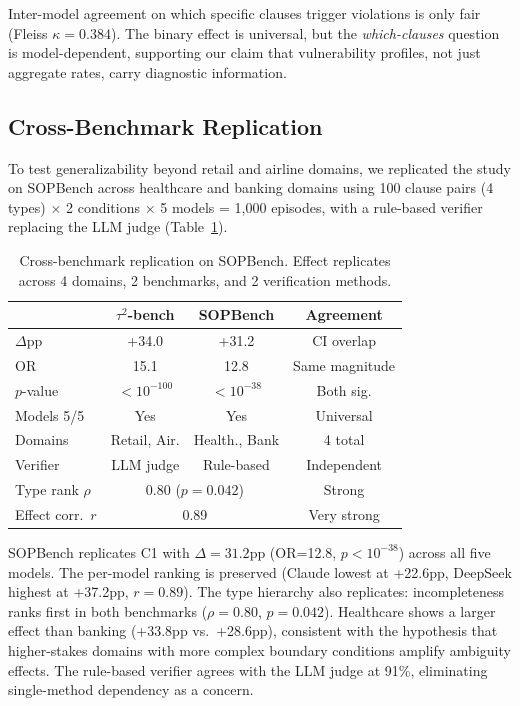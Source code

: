 \documentclass[11pt,a4paper]{article}
\begin{document}
Inter-model agreement on which specific clauses trigger violations is only fair (Fleiss $\kappa=0.384$). The binary effect is universal, but the \textit{which-clauses} question is model-dependent, supporting our claim that vulnerability profiles, not just aggregate rates, carry diagnostic information.

\subsection{Cross-Benchmark Replication}

To test generalizability beyond retail and airline domains, we replicated the study on SOPBench \cite{li2025sopbench} across healthcare and banking domains using 100 clause pairs (4 types) $\times$ 2 conditions $\times$ 5 models = 1,000 episodes, with a rule-based verifier replacing the LLM judge (Table~\ref{tab:sopbench}).

\begin{table}[t]
\centering
\small
\caption{Cross-benchmark replication on SOPBench. Effect replicates across 4 domains, 2 benchmarks, and 2 verification methods.}
\label{tab:sopbench}
\begin{tabular}{lccc}
\toprule
& \textbf{$\tau^2$-bench} & \textbf{SOPBench} & \textbf{Agreement} \\
\midrule
$\Delta$pp & +34.0 & +31.2 & CI overlap \\
OR & 15.1 & 12.8 & Same magnitude \\
$p$-value & $<10^{-100}$ & $<10^{-38}$ & Both sig. \\
Models 5/5 & Yes & Yes & Universal \\
Domains & Retail, Air. & Health., Bank & 4 total \\
Verifier & LLM judge & Rule-based & Independent \\
\midrule
Type rank $\rho$ & \multicolumn{2}{c}{0.80 ($p=0.042$)} & Strong \\
Effect corr.\ $r$ & \multicolumn{2}{c}{0.89} & Very strong \\
\bottomrule
\end{tabular}
\end{table}

SOPBench replicates C1 with $\Delta=31.2$pp (OR=12.8, $p<10^{-38}$) across all five models. The per-model ranking is preserved (Claude lowest at +22.6pp, DeepSeek highest at +37.2pp, $r=0.89$). The type hierarchy also replicates: incompleteness ranks first in both benchmarks ($\rho=0.80$, $p=0.042$). Healthcare shows a larger effect than banking (+33.8pp vs.\ +28.6pp), consistent with the hypothesis that higher-stakes domains with more complex boundary conditions amplify ambiguity effects. The rule-based verifier agrees with the LLM judge at 91\%, eliminating single-method dependency as a concern.
\end{document}
